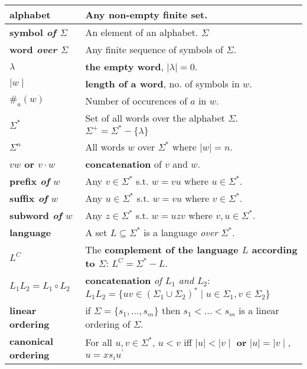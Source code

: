 \setlength{\tabcolsep}{6pt}
\begin{tabu} to 
  alphabet \norm{($\Sigma$)} & Any non-empty finite set.\\ \hline
  symbol {\it of $\Sigma$} & An element of an alphabet.
  $\Sigma$\\ \hline
  word {\it over $\Sigma$} & Any finite sequence of symbols of $\Sigma$.
  \\ \hline
  $\lambda$ & {\bf the empty word}, $\mid\lambda\mid = 0$. \\ \hline
  $\mid w \mid$ & {\bf length of a word}, no. of symbols in $w$. \\ \hline
  $\#_a(w)$ & Number of occurences of $a$ in $w$. \\ \hline
  $\Sigma^*$ & Set of all words over the alphabet $\Sigma$. \newline
  $\Sigma^+ = \Sigma^* - \{\lambda\}$ \\ \hline
  $\Sigma^n$ & All words $w$ over $\Sigma^*$ where $\mid w \mid = n$.
  \\ \hline
  $vw$ or $v \cdot w$ & {\bf concatenation} of $v$ and $w$. \\ \hline
  prefix {\it of} $w$ & Any $v \in \Sigma^*$ s.t. $w = vu$ where $u \in \Sigma^*$.
  \\ \hline
  suffix {\it of} $w$ & Any $u \in \Sigma^*$ s.t. $w = vu$ where $v \in \Sigma^*$.
  \\ \hline
  subword {\it of} $w$ & Any $z \in \Sigma^*$ s.t. $w = uzv$ where  $v, u \in
  \Sigma^*$. \\ \hline
  language  & A set $L \subseteq \Sigma^*$ is a language {\it over}
  $\Sigma^*$. \\ \hline
  $L^C$ & The {\bf complement of the language $L$ according to $\Sigma$}:
  $L^C = \Sigma^* - L$. \\ \hline
  $L_1L_2 = L_1 \circ L_2$ & {\bf concatenation} {\it of $L_1$ and $L_2$}: \newline
  $L_1L_2 = \{uv \in \left(\Sigma_1 \cup \Sigma_2 \right)^* \mid u \in \Sigma_1,
  v \in \Sigma_2\}$ \\ \hline
  linear \newline ordering & if $\Sigma = \{s_1, \ldots, s_m\}$ then
  $s_1 < \ldots < s_m$ is a linear ordering of $\Sigma$. \\ \hline
  canonical \newline ordering & For all $u,v \in \Sigma^*$, $u < v$ iff $\mid u
  \mid < \mid v \mid$ {\bf or} $\mid u \mid = \mid v \mid$, $u = xs_iu^\prime$

\end{tabu}
